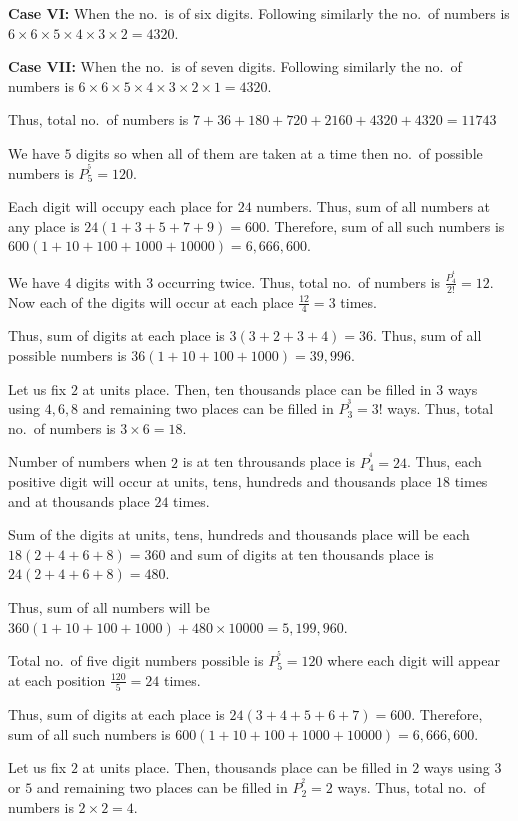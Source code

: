   {\bf Case VI:} When the no.\ is of six digits. Following similarly the no.\ of numbers is
  $6\times6\times5\times4\times3\times2 = 4320$.

  {\bf Case VII:} When the no.\ is of seven digits. Following similarly the no.\ of numbers is
  $6\times6\times5\times4\times3\times2\times1 = 4320$.

  Thus, total no.\ of numbers is $7 + 36 + 180 + 720 + 2160 + 4320 + 4320 = 11743$
\item We have $5$ digits so when all of them are taken at a time then no.\ of possible numbers is $P_5^^5 = 120$.

  Each digit will occupy each place for $24$ numbers. Thus, sum of all numbers at any place is $24(1 + 3 + 5
  + 7 + 9) = 600$. Therefore, sum of all such numbers is $600(1 + 10 + 100 + 1000 + 10000) = 6,666,600$.
\item We have $4$ digits with $3$ occurring twice. Thus, total no.\ of numbers is $\frac{P_4^^4}{2!} =
  12$. Now each of the digits will occur at each place $\frac{12}{4} = 3$ times.

  Thus, sum of digits at each place is $3(3 + 2 + 3 + 4) = 36$. Thus, sum of all possible numbers is $36(1 +
  10 + 100 + 1000) = 39,996$.
\item Let us fix $2$ at units place. Then, ten thousands place can be filled in $3$ ways using $4, 6, 8$ and
  remaining two places can be filled in $P_3^^3 = 3!$ ways. Thus, total no.\ of numbers is $3\times6 = 18$.

  Number of numbers when $2$ is at ten throusands place is $P_4^^4 = 24$. Thus, each positive digit will
  occur at units, tens, hundreds and thousands place $18$ times and at thousands place $24$ times.

  Sum of the digits at units, tens, hundreds and thousands place will be each $18(2 + 4 + 6 + 8) = 360$ and
  sum of digits at ten thousands place is $24(2 + 4 + 6 + 8) = 480$.

  Thus, sum of all numbers will be $360(1 + 10 + 100 + 1000) + 480\times10000 = 5,199,960$.
\item Total no.\ of five digit numbers possible is $P_5^^5 = 120$ where each digit will appear at each
  position $\frac{120}{5} = 24$ times.

  Thus, sum of digits at each place is $24(3 + 4 + 5 + 6 + 7) = 600$. Therefore, sum of all such numbers is
  $600(1 + 10 + 100 + 1000 + 10000) = 6,666,600$.
\item Let us fix $2$ at units place. Then, thousands place can be filled in $2$ ways using $3$ or $5$ and
  remaining two places can be filled in $P_2^^2 = 2$ ways. Thus, total no.\ of numbers is $2\times 2 = 4$.

